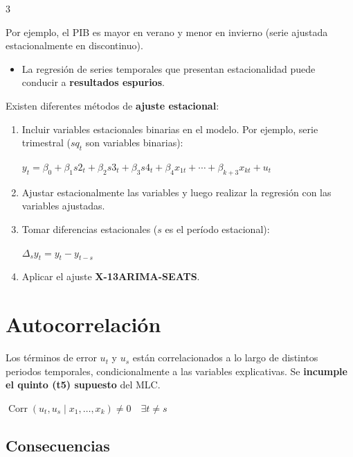 \documentclass[10pt, a4paper, landscape]{article}
\DeclareMathOperator{\Corr}{Corr}
\begin{document}
\begin{multicols}{3}
\vspace*{0.1cm}

Por ejemplo, el PIB es mayor en verano y menor en invierno (serie ajustada estacionalmente en {\color{red} discontinuo}).

\begin{itemize}[leftmargin=*]
	\item La regresión de series temporales que presentan estacionalidad puede conducir a \textbf{resultados espurios}.
\end{itemize}

Existen diferentes métodos de \textbf{ajuste estacional}:

\begin{enumerate}[leftmargin=*, label=\alph{*}.]
	\item Incluir variables estacionales binarias en el modelo. Por ejemplo, serie trimestral (\( sq_{t} \) son variables binarias):
	\begin{center}
		\( y_{t} = \beta_{0} + \beta_{1} s2_{t} + \beta_{2} s3_{t} + \beta_{3} s4_{t} + \beta_{4} x_{1t} + \cdots + \beta_{k + 3} x_{kt} + u_{t} \)
	\end{center}
	\item Ajustar estacionalmente las variables y luego realizar la regresión con las variables ajustadas.
	\item Tomar diferencias estacionales (\( s \) es el período estacional):
	\begin{center}
		\( \Delta_{s} y_{t} = y_{t} - y_{t - s} \)
	\end{center}
	\item Aplicar el ajuste \textbf{X-13ARIMA-SEATS}.
\end{enumerate}

\columnbreak

\section*{Autocorrelación}

Los términos de error \( u_{t} \) y \( u_{s} \) están correlacionados a lo largo de distintos periodos temporales, condicionalmente a las variables explicativas. Se \textbf{incumple el quinto (t5) supuesto} del MLC.

\begin{center}
	\( \Corr(u_{t}, u_{s} \mid x_{1}, \ldots, x_{k}) \neq 0 \quad \exists t \neq s \)
\end{center}

\subsection*{Consecuencias}


\end{multicols}
\end{document}
